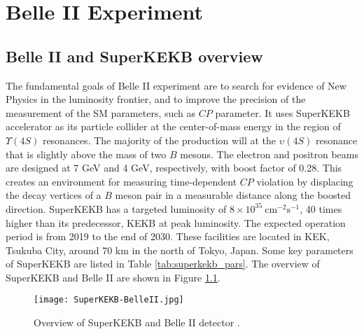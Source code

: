 \chapter{Belle II Experiment}
\section{Belle II and SuperKEKB overview}
The fundamental goals of Belle II experiment are to search for evidence of New Physics in the luminosity frontier, and to improve the precision of the measurement of the SM parameters, such as $CP$ parameter.\cite{b2book} It uses SuperKEKB accelerator as its particle collider at the center-of-mass energy in the region of $\Upsilon(4S)$ resonances. The majority of the production will at the $\upsilon(4S)$ resonance that is slightly above the mass of two $B$ mesons. The electron and positron beams are designed at 7 GeV and 4 GeV, respectively, with boost factor of 0.28. This creates an environment for measuring time-dependent $CP$ violation by displacing the decay vertices of a $B$ meson pair in a measurable distance along the boosted direction. SuperKEKB has a targeted luminosity of $8\times 10^{35}\: \text{cm}^{-2} \text{s}^{-1}$, 40 times higher than its predecessor, KEKB at peak luminosity. The expected operation period is from 2019 to the end of 2030. These facilities are located in KEK, Tsukuba City, around 70 km in the north of Tokyo, Japan. Some key parameters of SuperKEKB are listed in Table \ref{tab:superkekb_pars}. The overview of SuperKEKB and Belle II are shown in Figure \ref{fig:superkekb_belle2}.

\begin{figure}
	\centering 
	\texttt{[image: SuperKEKB-BelleII.jpg]}
	\caption{Overview of SuperKEKB and Belle II detector \cite{Abe:2010gxa}.}
	\label{fig:superkekb_belle2}
\end{figure}

